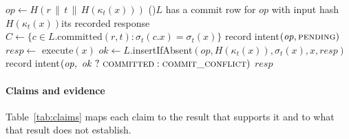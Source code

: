 \begin{algorithm}[!tbp]
\caption{Layered semantic fence (the proposed configuration).}\label{alg:fence}
\scriptsize
{}
$\mathit{op}\gets H(r\,\|\,t\,\|\,H(\kappa_t(x)))$\;
\If(){$L$ has a commit row for $\mathit{op}$ with input hash $H(\kappa_t(x))$}{\Return its recorded response}
$C\gets\{c\in L.\mathrm{committed}(r,t) : \sigma_t(c.x)=\sigma_t(x)\}$
record intent$(\mathit{op},\textsc{pending})$\;
$\mathit{resp}\gets$ execute$(x)$ 
$\mathit{ok}\gets L.$insertIfAbsent$(\mathit{op},H(\kappa_t(x)),\sigma_t(x),x,\mathit{resp})$ 
record intent$(\mathit{op},\ \mathit{ok}\ ?\ \textsc{committed} : \textsc{commit\_conflict})$\;
\Return $\mathit{resp}$\;
\end{algorithm}






\paragraph{Claims and evidence}
Table~\ref{tab:claims} maps each claim to the result that supports it and to what that result does not establish.


